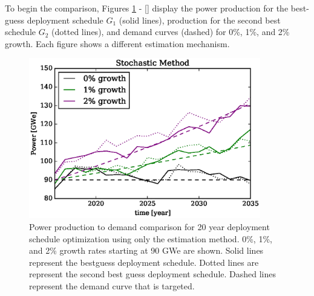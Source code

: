 To begin the comparison, Figures \ref{demand-product-stochastic} - 
\ref{} display the
power production for the best-guess deployment schedule $G_1$ (solid lines),
production for the second best schedule $G_2$ (dotted lines), 
and demand curves (dashed) for 0\%, 1\%, and 2\% growth. 
Each figure shows a different estimation mechanism.

\begin{figure}[htb]
\centering
\includegraphics[width=0.9\textwidth]{demand-product-stochastic.eps}
\caption{Power production to demand comparison for 20 year deployment 
schedule optimization using only the \stochastic estimation method.
0\%, 1\%, and 2\% growth rates starting at 90 GWe are shown. Solid lines 
represent the bestguess deployment schedule.  Dotted lines are represent 
the second best guess deployment schedule. Dashed lines represent the 
demand curve that is targeted.
}
\label{demand-product-stochastic}
\end{figure}

